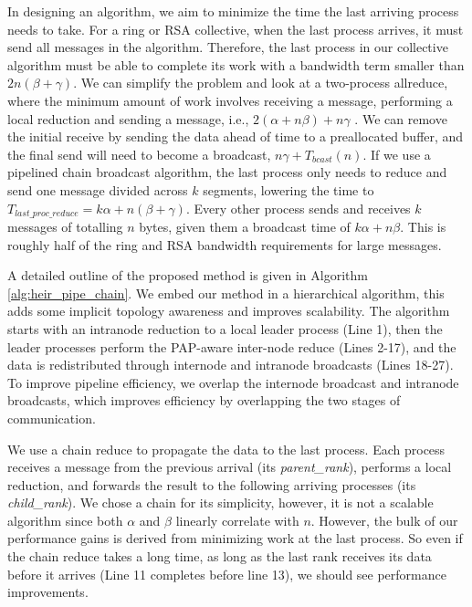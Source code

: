 In designing an algorithm, we aim to minimize the time the last arriving process needs to take.
For a ring or \gls{RSA} collective, when the last process arrives, it must send all messages in the algorithm.
Therefore, the last process in our collective algorithm must be able to complete its work with a bandwidth term smaller than $2n(\beta+\gamma)$. 
We can simplify the problem and look at a two-process allreduce, where the minimum amount of work involves receiving a message, performing a local reduction and sending a message, i.e., $2(\alpha+n\beta)+n\gamma$ \cite{Marendic2016Clairvoyant}.
We can remove the initial receive by sending the data ahead of time to a preallocated buffer, and the final send will need to become a broadcast, $n\gamma+T_{bcast}(n)$. 
If we use a pipelined chain broadcast algorithm, the last process only needs to reduce and send one message divided across $k$ segments, lowering the time to $T_{last\_proc\_reduce}=k\alpha+n(\beta+\gamma)$.
Every other process sends and receives $k$ messages of totalling $n$ bytes, given them a broadcast time of $k\alpha+n\beta$.
This is roughly half of the ring and \gls{RSA} bandwidth requirements for large messages.

A detailed outline of the proposed method is given in Algorithm \ref{alg:heir_pipe_chain}.
We embed our method in a hierarchical algorithm, this adds some implicit topology awareness and improves scalability.
The algorithm starts with an intranode reduction to a local leader process (Line 1), then the leader processes perform the \gls{PAP}-aware inter-node reduce (Lines 2-17), and the data is redistributed through internode and intranode broadcasts (Lines 18-27).
To improve pipeline efficiency, we overlap the internode broadcast and intranode broadcasts, which improves efficiency by overlapping the two stages of communication.



We use a chain reduce to propagate the data to the last process. 
Each process receives a message from the previous arrival (its \textit{parent\_rank}), performs a local reduction, and forwards the result to the following arriving processes (its \textit{child\_rank}).
We chose a chain for its simplicity, however, it is not a scalable algorithm since both $\alpha$ and $\beta$ linearly correlate with $n$.
However, the bulk of our performance gains is derived from minimizing work at the last process. 
So even if the chain reduce takes a long time, as long as the last rank receives its data before it arrives (Line 11 completes before line 13), we should see performance improvements.


